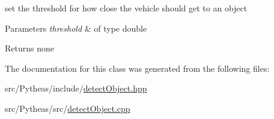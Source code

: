 set the threshold for how close the vehicle should get to an object 


\begin{DoxyParams}{Parameters}
{\em threshold} & of type double \\
\hline
\end{DoxyParams}
\begin{DoxyReturn}{Returns}
none 
\end{DoxyReturn}


The documentation for this class was generated from the following files\+:\begin{DoxyCompactItemize}
\item 
src/\+Pytheas/include/\hyperlink{detect_object_8hpp}{detect\+Object.\+hpp}\item 
src/\+Pytheas/src/\hyperlink{detect_object_8cpp}{detect\+Object.\+cpp}\end{DoxyCompactItemize}
